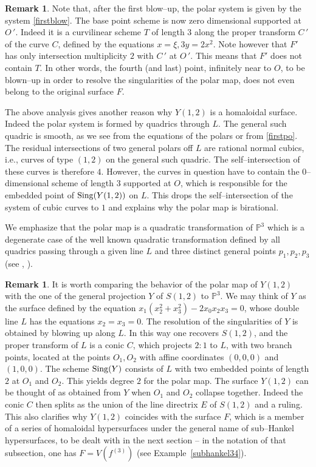 \documentclass[11pt]{article}   %
\theoremstyle{definition}
\newtheorem{Remark}[Theorem]{Remark}
\numberwithin{Theorem}{section} \numberwithin{equation}{section}
\newcommand{\p}{{\mathbb P}}
\begin{document}
{\begin{Remark}\label{effbeh} Note that, after the first blow--up, the
polar system is given by the system  \eqref{firstblow}. The base
point scheme is now zero dimensional supported at $O\,'$. Indeed it
is a curvilinear scheme $T$ of length $3$ along the proper transform
$C\,'$ of the curve $C$, defined by the equations $x=\xi, 3y=2x^ 2$.
Note however that $F'$ has only intersection multiplicity $2$ with
$C\,'$ at $O\,'$. This means that $F'$ does not contain $T$. In
other words, the fourth (and last) point, infinitely near to $O$, to
be blown--up in order to resolve the singularities of the polar map,
does not even belong to the original surface  $F$.
\end{Remark}

The above analysis gives another reason why $Y(1,2)$ is a homaloidal
surface. Indeed the polar system is formed by quadrics through $L$.
The general such quadric is smooth, as we see from the equations
of the polars or from \eqref {firstpo}. The residual
intersections of two general polars off $L$ are rational normal
cubics, i.e.,  curves of type $(1,2)$ on the general such quadric.
The self--intersection of these curves is therefore $4$. However,
the curves in question have to contain the $0$--dimensional scheme
of length $3$ supported at $O$, which is responsible for the
embedded point of ${\rm Sing}(Y(1,2))$ on $L$. This drops the
self--intersection of the system of cubic curves to $1$ and explains
why the polar map is birational.

We emphasize that the polar map is a quadratic transformation of
$\p^ 3$ which is a degenerate case of the well known quadratic
transformation defined by all quadrics passing through a given line
$L$ and three distinct general points $p_1,p_2,p_3$ (see
\cite{Conf}, \cite{Pan}).
\medskip


\begin{Remark} \label{genscroll} It is worth comparing the behavior of
the polar map of $Y(1,2)$ with the one of the general projection $Y$
of $S(1,2)$ to $\p^ 3$. We may think of $Y$ as the surface defined
by the equation $x_1(x_2^ 2+x_3^ 2)-2x_0x_2x_3=0$, whose double line
$L$ has the equations $x_2=x_3=0$. The resolution of the
singularities of $Y$ is obtained by blowing up along $L$. In this
way one recovers $S(1,2)$, and the proper transform of $L$ is a
conic $C$, which projects $2:1$ to $L$, with two branch points,
located at the points $O_1, O_2$ with affine coordinates $(0,0,0)$
and $(1,0,0)$. The scheme ${\rm Sing}(Y)$ consists of $L$ with two
embedded points of length $2$ at $O_1$ and $O_2$. This yields degree
$2$ for the polar map. The surface $Y(1,2)$ can be thought of as
obtained from $Y$ when $O_1$ and $O_2$ collapse together. Indeed the
conic $C$ then splits as the union of the line directrix $E$ of
$S(1,2)$ and a ruling. This also clarifies why $Y(1,2)$ coincides
with the surface $F$, which is a member of a series of homaloidal
hypersurfaces under the general name of sub--Hankel hypersurfaces,
to be dealt with in the next section -- in the notation of that
subsection, one has $F=V(f^{(3)})$ (see Example~\ref{subhankel34}).
\end{Remark}


}
\end{document}
